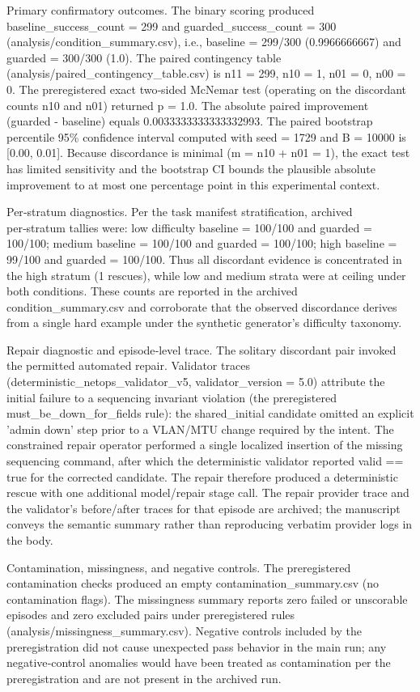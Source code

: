 \documentclass[conference]{IEEEtran}
\begin{document}
Primary confirmatory outcomes. The binary scoring produced baseline\_success\_count = 299 and guarded\_success\_count = 300 (analysis/condition\_summary.csv), i.e., baseline = 299/300 (0.9966666667) and guarded = 300/300 (1.0). The paired contingency table (analysis/paired\_contingency\_table.csv) is n11 = 299, n10 = 1, n01 = 0, n00 = 0. The preregistered exact two‑sided McNemar test (operating on the discordant counts n10 and n01) returned p = 1.0. The absolute paired improvement (guarded - baseline) equals 0.0033333333333332993. The paired bootstrap percentile 95\% confidence interval computed with seed = 1729 and B = 10000 is [0.00, 0.01]. Because discordance is minimal (m = n10 + n01 = 1), the exact test has limited sensitivity and the bootstrap CI bounds the plausible absolute improvement to at most one percentage point in this experimental context.

Per‑stratum diagnostics. Per the task manifest stratification, archived per‑stratum tallies were: low difficulty baseline = 100/100 and guarded = 100/100; medium baseline = 100/100 and guarded = 100/100; high baseline = 99/100 and guarded = 100/100. Thus all discordant evidence is concentrated in the high stratum (1 rescues), while low and medium strata were at ceiling under both conditions. These counts are reported in the archived condition\_summary.csv and corroborate that the observed discordance derives from a single hard example under the synthetic generator's difficulty taxonomy.

Repair diagnostic and episode‑level trace. The solitary discordant pair invoked the permitted automated repair. Validator traces (deterministic\_netops\_validator\_v5, validator\_version = 5.0) attribute the initial failure to a sequencing invariant violation (the preregistered must\_be\_down\_for\_fields rule): the shared\_initial candidate omitted an explicit 'admin down' step prior to a VLAN/MTU change required by the intent. The constrained repair operator performed a single localized insertion of the missing sequencing command, after which the deterministic validator reported valid == true for the corrected candidate. The repair therefore produced a deterministic rescue with one additional model/repair stage call. The repair provider trace and the validator's before/after traces for that episode are archived; the manuscript conveys the semantic summary rather than reproducing verbatim provider logs in the body.

Contamination, missingness, and negative controls. The preregistered contamination checks produced an empty contamination\_summary.csv (no contamination flags). The missingness summary reports zero failed or unscorable episodes and zero excluded pairs under preregistered rules (analysis/missingness\_summary.csv). Negative controls included by the preregistration did not cause unexpected pass behavior in the main run; any negative‑control anomalies would have been treated as contamination per the preregistration and are not present in the archived run.
\end{document}
